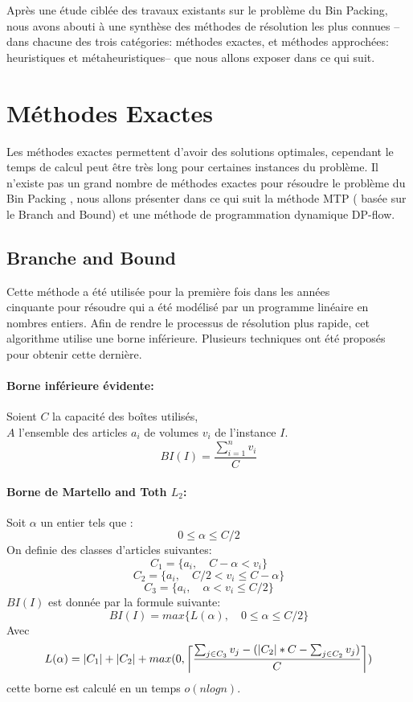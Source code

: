 \documentclass[class=report, crop=false]{standalone}
\DeclarePairedDelimiter\ceil{\lceil}{\rceil}
\begin{document}
\setcounter{section}{0}
    Après une étude ciblée des travaux existants sur le problème du Bin Packing, nous avons abouti à une synthèse des méthodes de résolution les plus connues --dans chacune des trois catégories: méthodes exactes, et méthodes approchées: heuristiques et métaheuristiques-- que nous allons exposer dans ce qui suit. 
    \section{Méthodes Exactes}
    Les méthodes exactes permettent d’avoir des solutions optimales, cependant le temps de calcul peut être très long pour certaines instances du problème. Il n’existe pas un grand nombre de méthodes exactes pour résoudre le problème du Bin Packing , nous allons présenter dans ce qui suit la méthode  MTP ( basée sur le Branch and Bound) et une méthode de programmation dynamique DP-flow.
    \subsection{Branche and Bound}
    Cette méthode a été  utilisée pour la première fois dans les années \\ cinquante pour résoudre qui a été  modélisé par un programme linéaire en nombres entiers.
Afin de rendre le processus de résolution plus rapide, cet algorithme utilise une borne inférieure. Plusieurs techniques ont été proposés pour obtenir cette dernière.
    \paragraph{Borne inférieure évidente:} Soient \(C\) la capacité des boîtes utilisés,\\
     \(A\) l’ensemble des articles \(a_i\) de volumes \(v_i\) de l’instance \(I\).
        \[BI(I)=\frac{\displaystyle\sum_{i=1}^{n} v_i}{C}\]
    \paragraph{Borne de Martello and Toth \(L_2\):}  
    Soit \(\alpha\) un entier tels que :
    \[0 \le \alpha \le C/2\]
    On definie des classes d'articles suivantes: 
    \[C_1 = \{a_i, \quad C-\alpha < v_i\} \]
    \[C_2 = \{a_i, \quad C/2 < v_i \le C-\alpha\} \]
    \[C_3 = \{a_i, \quad \alpha < v_i \le C/2\} \]
    \(BI(I)\)  est donnée par la formule suivante:
    \[BI(I)=max\{L(\alpha),\quad 0 \le \alpha \le C/2\}\]
    Avec
    \[L(\alpha)=|C_1|+|C_2|+max(0, \ceil*{\frac{\sum_{j \in C_3}^{} v_j - (|C_2|*C - \sum_{j \in C_2}^{} v_j) }{C}})\]
    cette borne est calculé en un temps \(o(nlogn)\).
\end{document}
